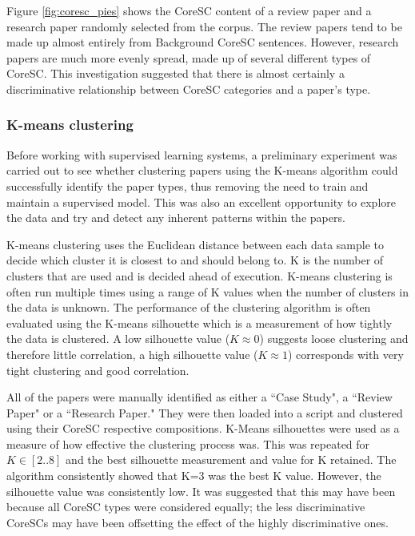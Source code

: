 Figure \ref{fig:coresc_pies} shows the CoreSC content of a review paper and a
research paper randomly selected from the corpus. The review papers tend to be
made up almost entirely from Background CoreSC sentences. However, research
papers are much more evenly spread, made up of several different types of
CoreSC. This investigation suggested that there is almost certainly a discriminative
relationship between CoreSC categories and a paper's type. 

\subsubsection{ K-means clustering}

Before working with supervised learning systems, a preliminary experiment was
carried out to see whether clustering papers using the K-means algorithm could
successfully identify the paper types, thus removing the need to train and
maintain a supervised model. This was also an excellent opportunity to explore
the data and try and detect any inherent patterns within the papers.

K-means clustering uses the Euclidean distance between each data sample to
decide which cluster it is closest to and should belong to. K is the number of
clusters that are used and is decided ahead of execution. K-means clustering is
often run multiple times using a range of K values when the number of clusters
in the data is unknown. The performance of the clustering algorithm is often
evaluated using the K-means silhouette which is a measurement of how tightly
the data is clustered. A low silhouette value ($K \approx 0$) suggests loose
clustering and therefore little correlation, a high silhouette value ($K
\approx 1$) corresponds with very tight clustering and good correlation.

All of the papers were manually identified as either a ``Case Study", a
``Review Paper" or a ``Research Paper." They were then loaded into a script and
clustered using their CoreSC respective compositions. K-Means silhouettes were
used as a measure of how effective the clustering process was. This was
repeated for $ K \in [2..8] $ and the best silhouette measurement and value for
K retained. The algorithm consistently showed that K=3 was the best K value.
However, the silhouette value was consistently low. It was suggested that this
may have been because all CoreSC types were considered equally; the less
discriminative CoreSCs may have been offsetting the effect of the highly
discriminative ones.

